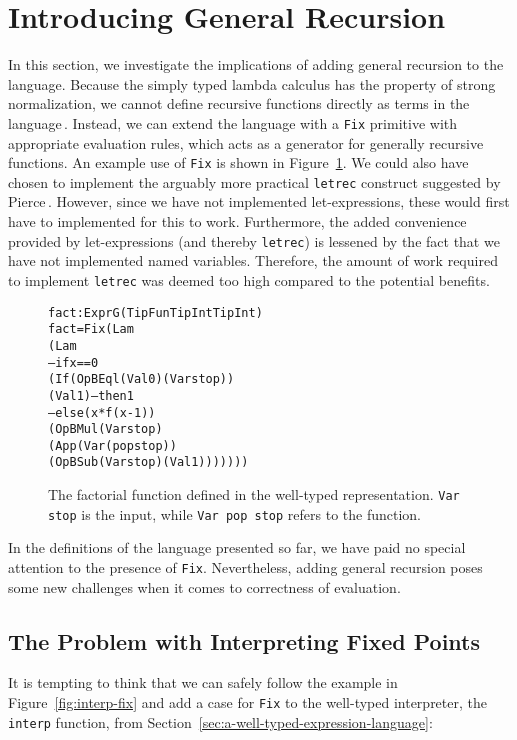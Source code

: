 \section{Introducing General Recursion}
\label{sec:partiality}

In this section, we investigate the implications of adding general recursion to the language. Because the simply typed lambda calculus has the property of strong normalization, we cannot define recursive functions directly as terms in the language\,\cite[p. 143]{Pierce:TypeSystems}. Instead, we can extend the language with a \texttt{Fix} primitive with appropriate evaluation rules, which acts as a generator for generally recursive functions. An example use of \texttt{Fix} is shown in Figure~\ref{fig:factorial}. We could also have chosen to implement the arguably more practical \texttt{letrec} construct suggested by Pierce\,\cite[p. 144]{Pierce:TypeSystems}. However, since we have not implemented let-expressions, these would first have to implemented for this to work. Furthermore, the added convenience provided by let-expressions (and thereby \texttt{letrec}) is lessened by the fact that we have not implemented named variables. Therefore, the amount of work required to implement \texttt{letrec} was deemed too high compared to the potential benefits.

\begin{figure}
\begin{alltt}
fact : Expr G (TipFun TipInt TipInt)
fact = Fix (Lam 
             (Lam 
                -- if x == 0
                (If (OpB Eql (Val 0) (Var stop))
                  (Val 1) -- then 1
                  -- else (x * f (x - 1))
                  (OpB Mul (Var stop) 
                           (App (Var (pop stop)) 
                                (OpB Sub (Var stop) (Val 1))))))) 
\end{alltt}
\caption{The factorial function defined in the well-typed representation. \texttt{Var stop} is the input, while \texttt{Var pop stop} refers to the function.}
\label{fig:factorial}
\end{figure}

In the definitions of the language presented so far, we have paid no special attention to the presence of \texttt{Fix}. Nevertheless, adding general recursion poses some new challenges when it comes to correctness of evaluation.

\subsection{The Problem with Interpreting Fixed Points}
It is tempting to think that we can safely follow the example in Figure~\ref{fig:interp-fix} and add a case for \texttt{Fix} to the well-typed interpreter, the \texttt{interp} function, from Section~\ref{sec:a-well-typed-expression-language}:

